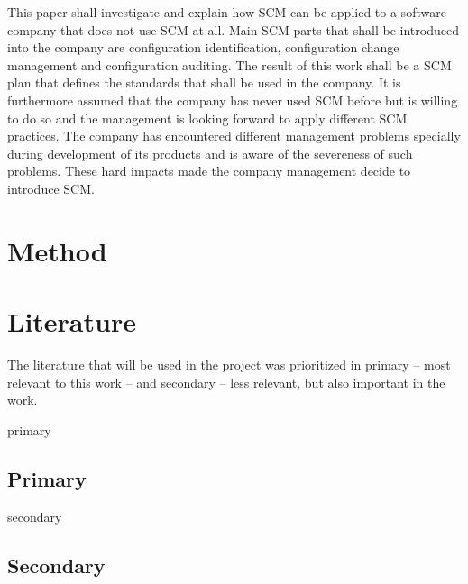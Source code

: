 \documentclass[a4paper]{article}
\begin{document}
This paper shall investigate and explain how SCM can be applied to a software company that does not use SCM at all. Main SCM parts that shall be introduced into the company are configuration identification, configuration change management and configuration auditing. The result of this work shall be a SCM plan that defines the standards that shall be used in the company. It is furthermore assumed that the company has never used SCM before but is willing to do so and the management is looking forward to apply different SCM practices. The company has encountered different management problems specially during development of its products and is aware of the severeness of such problems. These hard impacts made the company management decide to introduce SCM.

\section{Method}

\newpage
\appendix
\section{Literature}

The literature that will be used in the project was prioritized in primary -- most relevant to this work -- and secondary -- less relevant, but also important in the work. 
\begin{btSect}[alpha]{primary}
\subsection{Primary}
\btPrintAll
\end{btSect}

\begin{btSect}[alpha]{secondary}
\subsection{Secondary}
\btPrintAll
\end{btSect}
\end{document}
